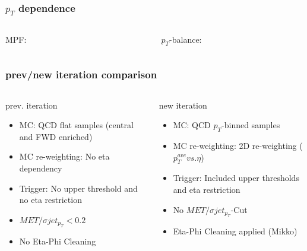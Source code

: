 \documentclass[t,compress]{beamer}
\begin{document}
\begin{frame}
\frametitle{$p_T$ dependence}
\begin{columns}
 \begin{column}{0.5\textwidth}
 MPF:
  \begin{figure}
\end{figure}
 \end{column}
\begin{column}{0.5\textwidth}
$p_T$-balance:
 \begin{figure}
\end{figure}
\end{column}
\end{columns}
\end{frame}


\begin{frame}
\frametitle{prev/new iteration comparison}
\vspace{1cm}
\begin{columns}
 \begin{column}{0.5\textwidth}
 prev. iteration
 \begin{itemize}
 \item MC: QCD flat samples (central and FWD enriched)
 \item MC re-weighting: No eta dependency
 \item Trigger: No upper threshold and no eta restriction  
 \item $MET/\sigma jet_{p_T} <0.2$
 \item No Eta-Phi Cleaning
\end{itemize}
 
 \end{column}
\begin{column}{0.5\textwidth}
new iteration
\begin{itemize}
 \item MC: QCD $p_T$-binned samples
 \item MC re-weighting: 2D re-weighting ($p_T^{ave} vs. \eta$)
 \item Trigger: Included upper thresholds and eta restriction
 \item No $MET/\sigma jet_{p_T}$-Cut
 \item Eta-Phi Cleaning applied (Mikko)
\end{itemize}

 \end{column}
 \end{columns}

 
\end{frame}
\end{document}
